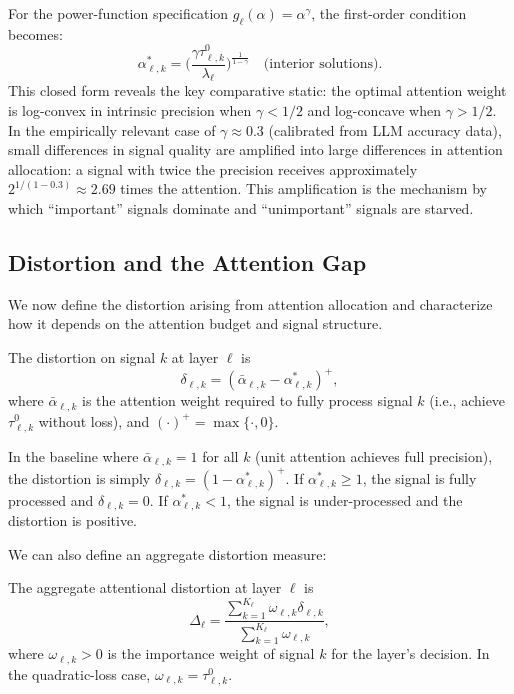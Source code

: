 For the power-function specification $g_\ell(\alpha) = \alpha^\gamma$, the first-order condition becomes:
\begin{equation}\label{eq:closed_form}
\alpha^*_{\ell,k} = \biggl(\frac{\gamma \tau^0_{\ell,k}}{\lambda_\ell}\biggr)^{\frac{1}{1-\gamma}} \quad \text{(interior solutions)}.
\end{equation}
This closed form reveals the key comparative static: the optimal attention weight is log-convex in intrinsic precision when $\gamma < 1/2$ and log-concave when $\gamma > 1/2$. In the empirically relevant case of $\gamma \approx 0.3$ (calibrated from LLM accuracy data), small differences in signal quality are amplified into large differences in attention allocation: a signal with twice the precision receives approximately $2^{1/(1-0.3)} \approx 2.69$ times the attention. This amplification is the mechanism by which ``important'' signals dominate and ``unimportant'' signals are starved.

\subsection{Distortion and the Attention Gap}
\label{subsec:distortion}

We now define the distortion arising from attention allocation and characterize how it depends on the attention budget and signal structure.

\begin{definition}\label{def:distortion}
The distortion on signal $k$ at layer $\ell$ is
\begin{equation}\label{eq:distortion}
\delta_{\ell,k} = (\bar{\alpha}_{\ell,k} - \alpha^*_{\ell,k})^+,
\end{equation}
where $\bar{\alpha}_{\ell,k}$ is the attention weight required to fully process signal $k$ (i.e., achieve $\tau^0_{\ell,k}$ without loss), and $(\cdot)^+ = \max\{\cdot, 0\}$.
\end{definition}

In the baseline where $\bar{\alpha}_{\ell,k} = 1$ for all $k$ (unit attention achieves full precision), the distortion is simply $\delta_{\ell,k} = (1 - \alpha^*_{\ell,k})^+$. If $\alpha^*_{\ell,k} \geq 1$, the signal is fully processed and $\delta_{\ell,k} = 0$. If $\alpha^*_{\ell,k} < 1$, the signal is under-processed and the distortion is positive.

We can also define an aggregate distortion measure:
\begin{definition}\label{def:aggregate_distortion}
The aggregate attentional distortion at layer $\ell$ is
\begin{equation}\label{eq:aggregate_distortion}
\Delta_\ell = \frac{\sum_{k=1}^{K_\ell} \omega_{\ell,k} \delta_{\ell,k}}{\sum_{k=1}^{K_\ell} \omega_{\ell,k}},
\end{equation}
where $\omega_{\ell,k} > 0$ is the importance weight of signal $k$ for the layer's decision. In the quadratic-loss case, $\omega_{\ell,k} = \tau^0_{\ell,k}$.
\end{definition}

